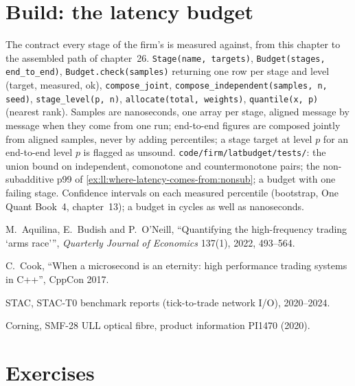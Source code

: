 \section{Build: the latency budget}\label{bld:ll:where-latency-comes-from:latbudget}

\begin{build}
 The contract every stage of the firm's  is measured against, from this chapter to the
assembled path of chapter~26.
 \texttt{Stage(name, targets)}, \texttt{Budget(stages, end\_to\_end)},
\texttt{Budget.check(samples)} returning one row per stage and level (target, measured, ok),
\texttt{compose\_joint}, \texttt{compose\_independent(samples, n, seed)}, \texttt{stage\_level(p, n)},
\texttt{allocate(total, weights)}, \texttt{quantile(x, p)} (nearest rank).
 Samples are nanoseconds, one array per stage, aligned message by message when they come from one run;
end-to-end figures are composed jointly from aligned samples, never by adding percentiles; a stage target at level
$p$ for an end-to-end level $p$ is flagged as unsound.
 \texttt{code/firm/latbudget/tests/}: the union bound on independent, comonotone and
countermonotone pairs; the non-subadditive p99 of \cref{ex:ll:where-latency-comes-from:nonsub}; a budget with one
failing stage.
 Confidence intervals on each measured percentile (bootstrap, One Quant Book~4, chapter~13); a
budget in cycles as well as nanoseconds.
\end{build}

\begin{omsources}
\item M.~Aquilina, E.~Budish and P.~O'Neill, ``Quantifying the high-frequency trading `arms race''', \emph{Quarterly
Journal of Economics} 137(1), 2022, 493--564.
\item C.~Cook, ``When a microsecond is an eternity: high performance trading systems in C++'', CppCon 2017.
\item STAC, STAC-T0 benchmark reports (tick-to-trade network I/O), 2020--2024.
\item Corning, SMF-28 ULL optical fibre, product information PI1470 (2020).
\end{omsources}

\section{Exercises}

